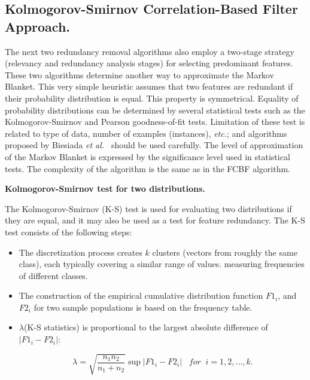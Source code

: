 \documentclass[a4paper,fleqn]{report}
\def\etal{{\em et al.\ }}
\def\etc{{\em etc.}}
\begin{document}
\subsection{Kolmogorov-Smirnov Correlation-Based Filter Approach.}

The next two redundancy removal algorithms also employ a two-stage strategy (relevancy and redundancy analysis stages) 
for selecting predominant features. These two algorithms determine another way to approximate the Markov Blanket. This very simple 
heuristic assumes that two features are redundant
if their probability distribution is equal. This property is symmetrical.
Equality of probability distributions can be determined by several statistical tests such as 
the Kolmogorov-Smirnov and Pearson goodness-of-fit tests.
Limitation of these test is related to type of data, number of examples (instances), \etc; and algorithms proposed by Biesiada \etal \cite{Biesiada2005,Biesiada2007,Biesiada2008,Blachnik2009}
should be used carefully. The level of approximation of the Markov Blanket is expressed by the significance level used in statistical
tests. The complexity of the algorithm is the same as in the FCBF algorithm.

{\bf Kolmogorov-Smirnov test for two distributions.}

The Kolmogorov-Smirnov (K-S) test \cite{Press1988} is used for evaluating two distributions 
if they are equal, and it may also be used as a test for feature redundancy.
The K-S test consists of the following steps:

\begin{itemize}
\item The discretization process creates $k$ clusters (vectors from roughly the same class), each typically covering a similar range of values.
      measuring frequencies of different classes.

\item The construction of the empirical cumulative distribution function $F1_i$, and $F2_i$ for two sample populations is based  on the frequency table.
\item $\lambda$(K-S statistics) is proportional to the largest absolute difference of $|F1_i-F2_i|$:

\begin{equation}
\lambda = \sqrt{\frac{n_{1} n_{2}}{n_{1}+n_{2}}} \sup
\left|F1_i - F2_i\right| \;\;\;  for \;\; i=1,2,...,k.
\end{equation}
\end{itemize}
\end{document}
